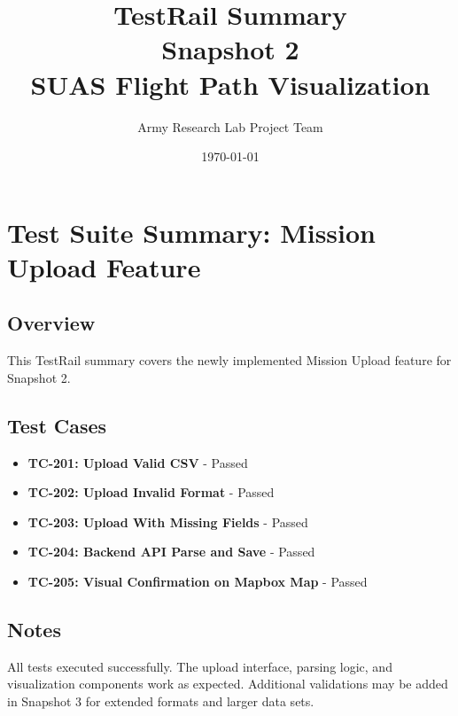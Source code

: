 \documentclass[12pt]{article}
\title{TestRail Summary\\Snapshot 2\\SUAS Flight Path Visualization}
\author{Army Research Lab Project Team}
\date{\today}
\begin{document}
\maketitle

\section*{Test Suite Summary: Mission Upload Feature}

\subsection*{Overview}
This TestRail summary covers the newly implemented Mission Upload feature for Snapshot 2.

\subsection*{Test Cases}
\begin{itemize}
  \item \textbf{TC-201: Upload Valid CSV} - Passed
  \item \textbf{TC-202: Upload Invalid Format} - Passed
  \item \textbf{TC-203: Upload With Missing Fields} - Passed
  \item \textbf{TC-204: Backend API Parse and Save} - Passed
  \item \textbf{TC-205: Visual Confirmation on Mapbox Map} - Passed
\end{itemize}

\subsection*{Notes}
All tests executed successfully. The upload interface, parsing logic, and visualization components work as expected. Additional validations may be added in Snapshot 3 for extended formats and larger data sets.
\end{document}

